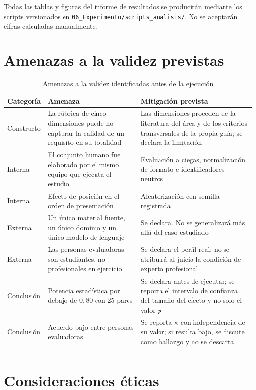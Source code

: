 \documentclass[11pt,a4paper]{article}
\newcommand{\id}[1]{\texttt{#1}}
\begin{document}
\noindent
Todas las tablas y figuras del informe de resultados se producirán mediante los scripts versionados
en \id{06\_Experimento/scripts\_analisis/}. No se aceptarán cifras calculadas manualmente.

\section{Amenazas a la validez previstas}

\begin{longtable}{|C{2.6cm}|L{5.6cm}|L{6.2cm}|}
\hline
{}\textbf{Categoría} & \textbf{Amenaza} & \textbf{Mitigación prevista} \\
\hline
\endhead
Constructo & La rúbrica de cinco dimensiones puede no capturar la calidad de un requisito en su totalidad & Las dimensiones proceden de la literatura del área y de los criterios transversales de la propia guía; se declara la limitación \\ \hline
Interna & El conjunto humano fue elaborado por el mismo equipo que ejecuta el estudio & Evaluación a ciegas, normalización de formato e identificadores neutros \\ \hline
Interna & Efecto de posición en el orden de presentación & Aleatorización con semilla registrada \\ \hline
Externa & Un único material fuente, un único dominio y un único modelo de lenguaje & Se declara. No se generalizará más allá del caso estudiado \\ \hline
Externa & Las personas evaluadoras son estudiantes, no profesionales en ejercicio & Se declara el perfil real; no se atribuirá al juicio la condición de experto profesional \\ \hline
Conclusión & Potencia estadística por debajo de $0{,}80$ con 25 pares & Se declara antes de ejecutar; se reporta el intervalo de confianza del tamaño del efecto y no solo el valor $p$ \\ \hline
Conclusión & Acuerdo bajo entre personas evaluadoras & Se reporta $\kappa$ con independencia de su valor; si resulta bajo, se discute como hallazgo y no se descarta \\ \hline
\caption{Amenazas a la validez identificadas antes de la ejecución}
\end{longtable}

\section{Consideraciones éticas}
\end{document}
